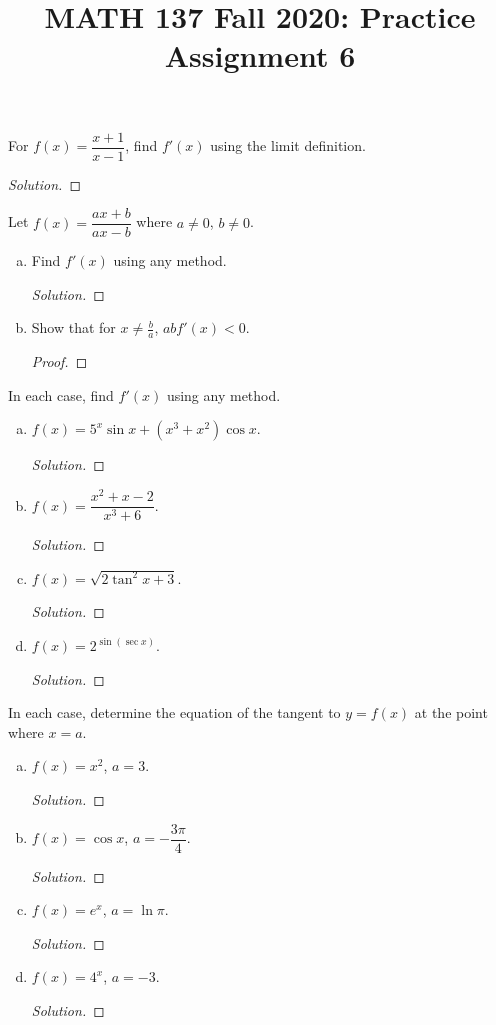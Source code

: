 
\title{MATH 137 Fall 2020: Practice Assignment 6}


\thispagestyle{firstpage}

\textbf{\@title}

\question For $f(x)=\dfrac{x+1}{x-1}$, find $f'(x)$ using the limit definition.
\begin{proof}[Solution]
\end{proof}


\question Let $f(x)=\dfrac{ax+b}{ax-b}$ where $a \neq 0$, $b \neq 0$.
\begin{enumerate}[(a)]
  \item Find $f'(x)$ using any method.
        \begin{proof}[Solution]
        \end{proof}
  \item Show that for $x \neq \frac{b}{a}$, $abf'(x)<0$.
        \begin{proof}
        \end{proof}
\end{enumerate}


\question In each case, find $f'(x)$ using any method.
\begin{enumerate}[(a)]
  \item $f(x)=5^x\sin x+(x^3+x^2)\cos x$.
        \begin{proof}[Solution]
        \end{proof}
  \item $f(x)=\dfrac{x^2+x-2}{x^3+6}$.
        \begin{proof}[Solution]
        \end{proof}
  \item $f(x)=\sqrt{2\tan^2x+3}$.
        \begin{proof}[Solution]
        \end{proof}
  \item $f(x)=2^{\sin(\sec x)}$.
        \begin{proof}[Solution]
        \end{proof}
\end{enumerate}


\question In each case, determine the equation of the tangent to $y=f(x)$ at the point where $x=a$.
\begin{enumerate}[(a)]
  \item $f(x)=x^2$, $a=3$.
        \begin{proof}[Solution]
        \end{proof}
  \item $f(x)=\cos x$, $a=-\dfrac{3\pi}{4}$.
        \begin{proof}[Solution]
        \end{proof}
  \item $f(x)=e^x$, $a=\ln\pi$.
        \begin{proof}[Solution]
        \end{proof}
  \item $f(x)=4^x$, $a=-3$.
        \begin{proof}[Solution]
        \end{proof}
\end{enumerate}


